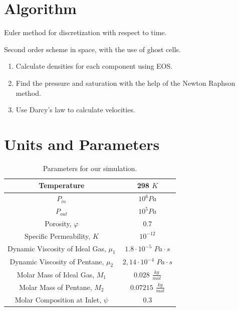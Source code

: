 \documentclass[a4paper,12pt]{article}
\begin{document}
\section{Algorithm}

Euler method for discretization with respect to time.

Second order scheme in space, with the use of ghost cells. 

\begin{enumerate}
    \item Calculate densities for each component using EOS.
    \item Find the pressure and saturation with the
        help of the Newton Raphson method.
    \item Use Darcy's law to calculate velocities.
\end{enumerate}

\section{Units and Parameters}

\begin{table}[H]
    \centering
    \caption{Parameters for our simulation.}
    \label{tab:label}
    \begin{tabular}{| c | c |}
        \hline
        Temperature & 298 \(K\) \\
        \hline
        \(P_{in}\) & \(10^6 Pa\) \\
        \hline
        \(P_{out}\) & \(10^5 Pa\) \\
        \hline
        Porosity, \(\varphi\) & 0.7 \\
        \hline
        Specific Permeability, \(K\) & \(10^{-12}\) \\
        \hline
        Dynamic Viscosity of Ideal Gas, \(\mu_1\) &
        \(1.8 \cdot 10^{-5}\) \(Pa \cdot s\) \\
        \hline
        Dynamic Viscosity of Pentane, \(\mu_2\) &
        \(2,14 \cdot 10^{-4}\) \( Pa \cdot s\) \\
        \hline
        Molar Mass of Ideal Gas, \(M_1\) & 
        \(0.028\) \(\frac{kg}{mol}\) \\
        \hline
        Molar Mass of Pentane, \(M_2\) & 
        \(0.07215\) \(\frac{kg}{mol}\) \\
        \hline
        Molar Composition at Inlet, \(\psi\) &
        \(0.3\) \\
        \hline
    \end{tabular}
\end{table}
\end{document}
